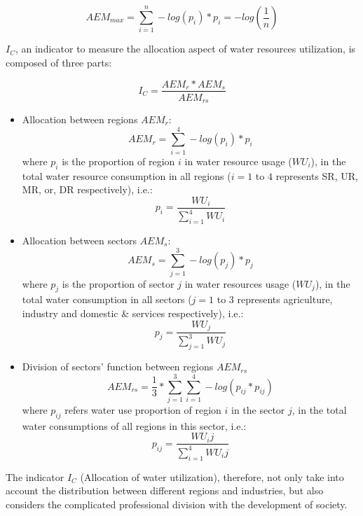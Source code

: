 \documentclass[9pt,twoside,lineno]{pnas-new}
\begin{document}
    $$ AEM_{max} = \sum_{i=1}^n -log(p_{i}) * p_{i} = - log(\frac{1}{n}) $$

    $I_C$, an indicator to measure the allocation aspect of water resources utilization, is composed of three parts:

    $$ I_C = \frac{AEM_{r}*AEM_{s}}{AEM_{rs}}$$

    \begin{itemize}
        \item Allocation between regions $AEM_r$:
            $$ AEM_r = \sum_{i=1}^4 -log(p_{i}) * p_{i} $$
            where $p_i$ is the proportion of region $i$ in water resource usage ($WU_i$), in the total water resource consumption in all regions ($i=1$ to $4$ represents SR, UR, MR, or, DR respectively), i.e.:
            $$ p_i = \frac{WU_i}{\sum_{i=1}^4 WU_i} $$
        \item Allocation between sectors $AEM_s$:
            $$ AEM_s = \sum_{j=1}^3 -log(p_{j}) * p_{j} $$
            where $p_j$ is the proportion of sector $j$ in water resources usage ($WU_j$), in the total water consumption in all sectors ($j=1$ to $3$ represents agriculture, industry and domestic \& services respectively), i.e.:
            $$ p_j = \frac{WU_j}{\sum_{j=1}^3 WU_j} $$
        \item Division of sectors' function between regions $AEM_{rs}$
            $$ AEM_{rs} = \frac{1}{3} * \sum_{j=1}^3 \sum_{i=1}^4 -log(p_{ij} * p_{ij})$$
            where $p_{ij}$ refers water use proportion of region $i$ in the sector $j$, in the total water consumptions of all regions in this sector, i.e.:
            $$ p_{ij} = \frac{WU_ij}{\sum_{i=1}^4 WU_ij} $$
    \end{itemize}

    The indicator $I_C$ (Allocation of water utilization), therefore, not only take into account the distribution between different regions and industries, but also considers the complicated professional division with the development of society.
\end{document}
